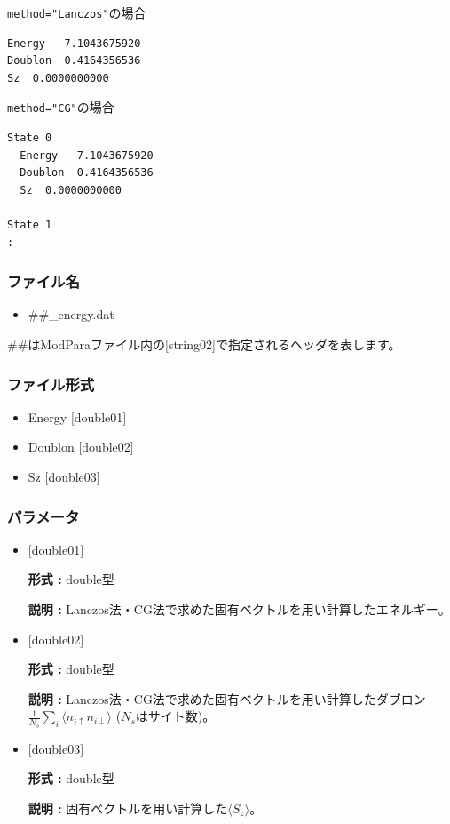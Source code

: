 \verb|method="Lanczos"|の場合

\begin{minipage}{12.5cm}
\begin{screen}
\begin{verbatim}
Energy  -7.1043675920 
Doublon  0.4164356536 
Sz  0.0000000000 
\end{verbatim}
\end{screen}
\end{minipage}

\verb|method="CG"|の場合

\begin{minipage}{12.5cm}
\begin{screen}
\begin{verbatim}
State 0
  Energy  -7.1043675920 
  Doublon  0.4164356536 
  Sz  0.0000000000 

State 1
:
\end{verbatim}
\end{screen}
\end{minipage}

\subsubsection{ファイル名}
\begin{itemize}
   \item  \#\#\_energy.dat
 \end{itemize}
  \#\#はModParaファイル内の[string02]で指定されるヘッダを表します。


\subsubsection{ファイル形式}
 \begin{itemize}
   \item Energy $[$double01$]$
   \item Doublon $[$double02$]$
   \item Sz $[$double03$]$
  \end{itemize}
\subsubsection{パラメータ}
 \begin{itemize}

  \item  $[$double01$]$
  
 {\bf 形式 :} double型

{\bf 説明 :} Lanczos法・CG法で求めた固有ベクトルを用い計算したエネルギー。
 
  \item  $[$double02$]$

 {\bf 形式 :} double型 

{\bf 説明 :} Lanczos法・CG法で求めた固有ベクトルを用い計算したダブロン
$\frac{1}{N_s} \sum_{i}\langle n_{i\uparrow}n_{i\downarrow}\rangle$ ($N_s$はサイト数)。

 \item  $[$double03$]$

 {\bf 形式 :} double型 

{\bf 説明 :} 固有ベクトルを用い計算した$\langle S_z\rangle$。

 \end{itemize}

